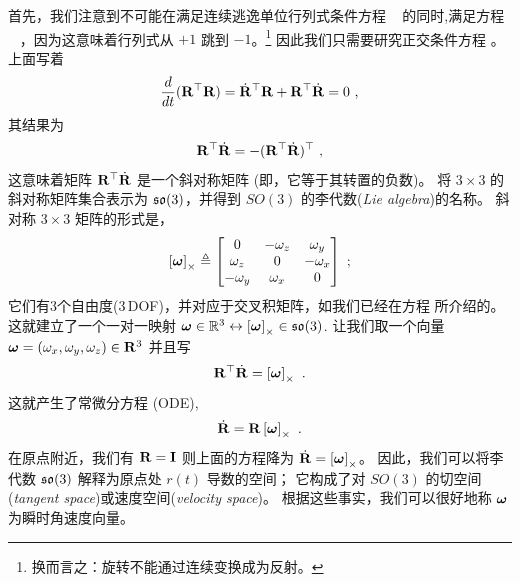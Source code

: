 首先，我们注意到不可能在满足连续逃逸单位行列式条件方程 ~ 的同时,满足方程 ~ ，因为这意味着行列式从 $+1$ 跳到 $-1$。\footnote{换而言之：旋转不能通过连续变换成为反射。}
因此我们只需要研究正交条件方程  。上面写着
%
\begin{align}
\frac{d}{dt}{({\bf R}^{\top}{\bf R})} = \dot{{\bf R}}^{\top}{\bf R}+{\bf R}^{\top}\dot{{\bf R}} = 0
~,
\end{align}
%
其结果为
%
\begin{align}
{\bf R}^{\top}\dot{{\bf R}} 
= -({\bf R}^{\top}\dot{{\bf R}})^{\top}
~,
\end{align}
%
这意味着矩阵 ${\bf R}^{\top}\dot{{\bf R}}$ 是一个斜对称矩阵 (即，它等于其转置的负数)。 
将 $3\times3$ 的斜对称矩阵集合表示为 ${\mathfrak {so}}(3)$，并得到 $SO(3)$ 的李代数(\emph{Lie algebra})的名称。
斜对称 $3\times3$ 矩阵的形式是，
%
\begin{align}
\left[{\bm \omega}\right]_\times \triangleq \begin{bmatrix}
0 & -\omega_z & \omega_y \\
\omega_z & 0 & -\omega_x \\
-\omega_y & \omega_x & 0
\end{bmatrix}
~;
\end{align}
%
它们有3个自由度(3\,DOF)，并对应于交叉积矩阵，如我们已经在方程  所介绍的。这就建立了一个一对一映射 ${\bm \omega}\in{\mathbb R}^3\leftrightarrow\left[{\bm \omega}\right]_\times\in{\mathfrak {so}}(3)$.
%
让我们取一个向量 ${\bm \omega}=(\omega_x,\omega_y,\omega_z)\in{\bf R}^3$ 并且写
%
\begin{align}
{\bf R}^{\top}\dot{{\bf R}} = \left[{\bm \omega}\right]_\times
~.
\end{align}
%
这就产生了常微分方程 (ODE),
%
\begin{align}
\label{equ:Rdot}
\dot{{\bf R}}={\bf R}\left[{\bm \omega}\right]_\times~.
\end{align}
%
在原点附近，我们有 ${\bf R}={\bf I}$ 则上面的方程降为 $\dot{{\bf R}}=\left[{\bm \omega}\right]_\times$。
因此，我们可以将李代数 ${\mathfrak {so}}(3)$ 解释为原点处 $r(t)$ 导数的空间；
它构成了对 $SO(3)$ 的切空间(\emph{tangent space})或速度空间(\emph{velocity space})。
根据这些事实，我们可以很好地称 ${\bm \omega}$ 为瞬时角速度向量。 

